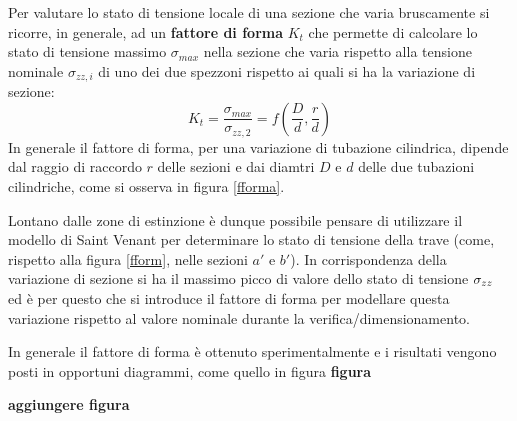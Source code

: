 		
		\begin{concetto}
			Per valutare lo stato di tensione locale di una sezione che varia bruscamente si ricorre, in generale, ad un \textbf{fattore di forma} $K_t$ che permette di calcolare lo stato di tensione massimo $\sigma_{max}$ nella sezione che varia rispetto alla tensione nominale $\sigma_{zz,i}$ di uno dei due spezzoni rispetto ai quali si ha la variazione di sezione:
			\begin{equation}
				K_t = \frac{\sigma_{max}}{\sigma_{zz,2}} = f\left(\frac D d, \frac r d\right)
			\end{equation}
			In generale il fattore di forma, per una variazione di tubazione cilindrica, dipende dal raggio di raccordo $r$ delle sezioni e dai diamtri $D$ e $d$ delle due tubazioni cilindriche, come si osserva in figura \ref{fforma}.
		\end{concetto}
	
		
		Lontano dalle zone di estinzione è dunque possibile pensare di utilizzare il modello di Saint Venant per determinare lo stato di tensione della trave (come, rispetto alla figura \ref{fform}, nelle sezioni $a'$ e $b'$). In corrispondenza della variazione di sezione si ha il massimo picco di valore dello stato di tensione $\sigma_{zz}$ ed è per questo che si introduce il fattore di forma per modellare questa variazione rispetto al valore nominale durante la verifica/dimensionamento.
		
		In generale il fattore di forma è ottenuto sperimentalmente e i risultati vengono posti in opportuni diagrammi, come quello in figura \textbf{figura}
		
		\textbf{aggiungere figura}
		
		
		
		
		
		
		
		
		
		
		
		
		
		
		
		
	